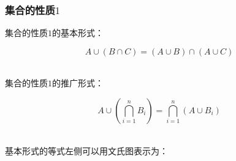 \documentclass[UTF8]{ctexart}
\begin{document}
\subsubsection{集合的性质$1$}
    集合的性质$1$的基本形式：
    \begin{large}
        \begin{equation*}
            A\cup(B\cap C)=(A\cup B)\cap(A\cup C)
        \end{equation*}
    \end{large}\\
    集合的性质$1$的推广形式：
    \begin{large}
        \begin{equation*}
            A\cup\left(\bigcap_{i=1}^n B_i\right)=\bigcap_{i=1}^n(A\cup B_i)
        \end{equation*}
    \end{large}\\[1mm]
    基本形式的等式左侧可以用文氏图表示为：\vspace{5pt}
\end{document}

